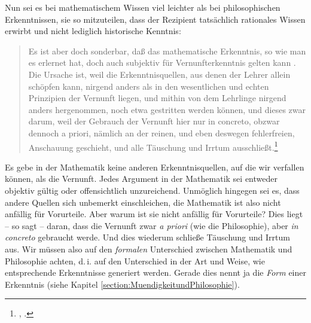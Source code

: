 Nun sei es bei mathematischem Wissen viel leichter als bei philosophischen
Erkenntnissen, sie so mitzuteilen, dass der Rezipient tatsächlich rationales
Wissen erwirbt und nicht lediglich historische Kenntnis:
\begin{quote}
 Es ist aber doch sonderbar, daß das mathematische Erkenntnis, so wie man es
erlernet hat, doch auch subjektiv für Vernunfterkenntnis gelten kann {\punkt}.
Die Ursache ist, weil die Erkenntnisquellen, aus denen der Lehrer allein schöpfen
kann, nirgend anders als in den wesentlichen und echten Prinzipien der Vernunft
liegen, und mithin von dem Lehrlinge nirgend anders hergenommen, noch etwa
gestritten werden können, und dieses zwar darum, weil der Gebrauch der Vernunft
hier nur in concreto, obzwar dennoch a priori, nämlich an der reinen, und eben
deswegen fehlerfreien, Anschauung geschieht, und alle Täuschung und Irrtum
ausschließt.\footnote{\cite[][B~865]{Kant:KritikderreinenVernunft2003}, \cite[][III:
541.24--34]{Kant:GesammelteWerke1900ff.}.}
\end{quote}
Es gebe in der Mathematik keine anderen Erkenntnisquellen, auf die wir
verfallen können, als die Vernunft. Jedes Argument in der Mathematik sei
entweder objektiv gültig oder offensichtlich unzureichend.
Unmöglich hingegen sei es, dass andere Quellen sich unbemerkt einschleichen, die
Mathematik ist also nicht anfällig für Vorurteile. Aber warum ist sie nicht
anfällig für Vorurteile? Dies liegt -- so sagt  -- daran,
dass die Vernunft zwar \emph{a priori} (wie die Philosophie), aber \emph{in
concreto} gebraucht werde. Und dies wiederum schließe Täuschung und Irrtum aus.
Wir müssen also auf den \emph{formalen} Unterschied zwischen Mathematik und
Philosophie achten, d.\,i. auf den Unterschied in der Art und Weise, wie
entsprechende Erkenntnisse generiert werden. Gerade dies nennt
 ja die \emph{Form} einer Erkenntnis (siehe Kapitel
\ref{section:MuendigkeitundPhilosophie}).



